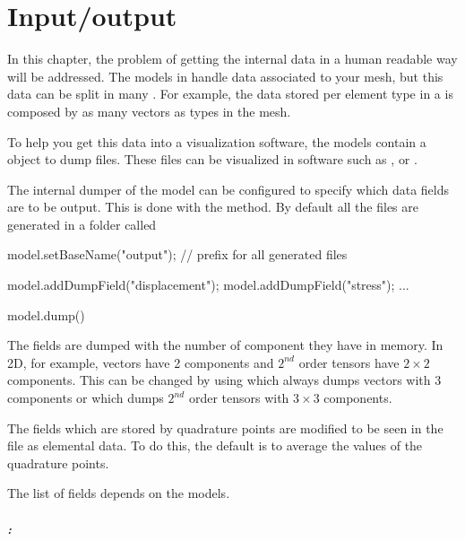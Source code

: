 \chapter{Input/output}

In this chapter, the problem of getting the internal data in a human readable way
will be addressed. The models in \akantu handle data associated to your
mesh, but this data can be split in many . For example, the
data stored per element type in a  is composed by as
many vectors as types in the mesh.

To help you get this data into a visualization software, the models contain a
object to dump  files. These files can be visualized in software such
as \cite{paraview}, \cite{visit} or \cite{mayavi}.

The internal dumper of the model can be configured to specify which data fields
are to be output. This is done with the
 method. By default all the files
are generated in a folder called 

\begin{cpp}
  model.setBaseName("output"); // prefix for all generated files

  model.addDumpField("displacement");
  model.addDumpField("stress");
  ...

  model.dump()
\end{cpp}

The fields are dumped with the number of component they have in memory. In 2D, for
example, vectors have 2 components and $2^{nd}$ order tensors have $2\times2$
components.  This can be changed by using
 which always dumps
vectors with 3 components or
 which dumps $2^{nd}$
order tensors with $3\times3$ components.

The fields which are stored by quadrature points are modified to be seen in the
 file as elemental data. To do this, the default is to average the
values of the quadrature points.

The list of fields depends on the models.

\paragraph{:}\hfill
\vspace*{0.2cm}

